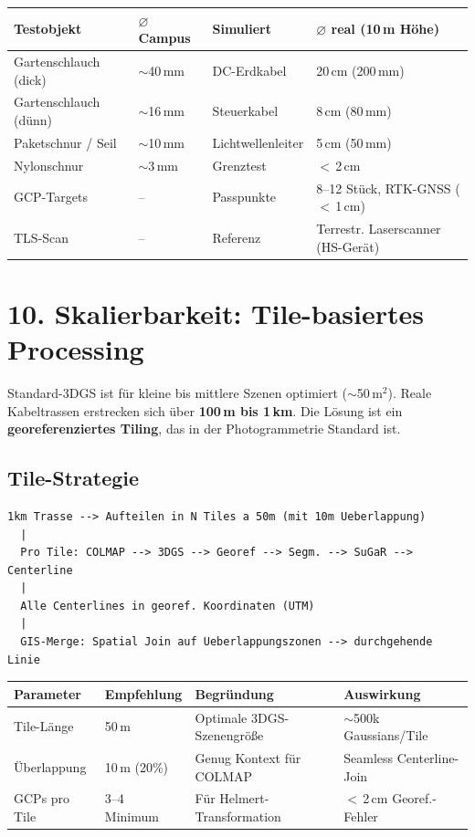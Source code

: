 \documentclass[11pt, a4paper]{article}
\begin{document}
\begin{center}
\small
\begin{tabular}{|p{3cm}|p{2cm}|p{3.5cm}|p{4.5cm}|}
\hline
\textbf{Testobjekt} & \textbf{$\varnothing$ Campus} & \textbf{Simuliert} & \textbf{$\varnothing$ real (10\,m H\"ohe)} \\
\hline
Gartenschlauch (dick) & $\sim$40\,mm & DC-Erdkabel & 20\,cm (200\,mm) \\
\hline
Gartenschlauch (d\"unn) & $\sim$16\,mm & Steuerkabel & 8\,cm (80\,mm) \\
\hline
Paketschnur / Seil & $\sim$10\,mm & Lichtwellenleiter & 5\,cm (50\,mm) \\
\hline
Nylonschnur & $\sim$3\,mm & Grenztest & $<$\,2\,cm \\
\hline
GCP-Targets & -- & Passpunkte & 8--12 St\"uck, RTK-GNSS ($<$\,1\,cm) \\
\hline
TLS-Scan & -- & Referenz & Terrestr. Laserscanner (HS-Ger\"at) \\
\hline
\end{tabular}
\end{center}

\section{10. Skalierbarkeit: Tile-basiertes Processing}

Standard-3DGS ist f\"ur kleine bis mittlere Szenen optimiert ($\sim$50\,m$^2$). Reale Kabeltrassen erstrecken sich \"uber \textbf{100\,m bis 1\,km}. Die L\"osung ist ein \textbf{georeferenziertes Tiling}, das in der Photogrammetrie Standard ist.

\subsection{Tile-Strategie}

\begin{lstlisting}[frame=none, backgroundcolor=\color{white}]
1km Trasse --> Aufteilen in N Tiles a 50m (mit 10m Ueberlappung)
  |
  Pro Tile: COLMAP --> 3DGS --> Georef --> Segm. --> SuGaR --> Centerline
  |
  Alle Centerlines in georef. Koordinaten (UTM)
  |
  GIS-Merge: Spatial Join auf Ueberlappungszonen --> durchgehende Linie
\end{lstlisting}

\begin{center}
\small
\begin{tabular}{|p{3cm}|p{2.5cm}|p{3cm}|p{4cm}|}
\hline
\textbf{Parameter} & \textbf{Empfehlung} & \textbf{Begr\"undung} & \textbf{Auswirkung} \\
\hline
Tile-L\"ange & 50\,m & Optimale 3DGS-Szenengr\"o\ss e & $\sim$500k Gaussians/Tile \\
\hline
\"Uberlappung & 10\,m (20\%) & Genug Kontext f\"ur COLMAP & Seamless Centerline-Join \\
\hline
GCPs pro Tile & 3--4 Minimum & F\"ur Helmert-Transformation & $<$\,2\,cm Georef.-Fehler \\
\hline
\end{tabular}
\end{center}
\end{document}
